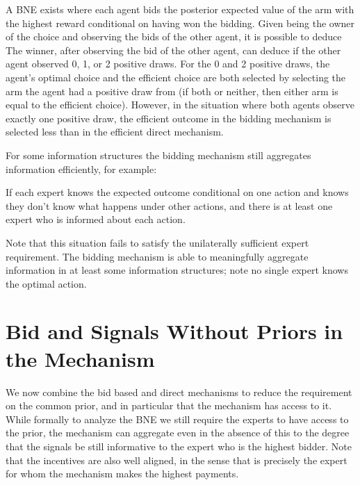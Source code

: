 A BNE exists where each agent bids the posterior expected value of the arm with the highest reward conditional on having won the bidding.
Given being the owner of the choice and observing the bids of the other agent, it is possible to deduce 
The winner, after observing the bid of the other agent, can deduce if the other agent observed 0, 1, or 2 positive draws. For the 0 and 2 positive draws, the agent's optimal choice and the efficient choice are both selected by selecting the arm the agent had a positive draw from (if both or neither, then either arm is equal to the efficient choice). 
However, in the situation where both agents observe exactly one positive draw, the efficient outcome in the bidding mechanism is selected less than in the efficient direct mechanism.


For some information structures the bidding mechanism still aggregates information efficiently, for example:

\begin{defn}\label{defn:specialists}
	If each expert knows the expected outcome conditional on one action and knows they don't know what happens under other actions, and there is at least one expert who is informed about each action.
\end{defn}

Note that this situation fails to satisfy the unilaterally sufficient expert requirement. The bidding mechanism is able to meaningfully aggregate information in at least some information structures; note no single expert knows the optimal action.






\section{Bid and Signals Without Priors in the Mechanism}

We now combine the bid based and direct mechanisms to reduce the requirement on the common prior, and in particular that the mechanism has access to it. 
While formally to analyze the BNE we still require the experts to have access to the prior, the mechanism can aggregate even in the absence of this to the degree that the signals be still informative to the expert who is the highest bidder.
Note that the incentives are also well aligned, in the sense that is precisely the expert for whom the mechanism makes the highest payments. 


